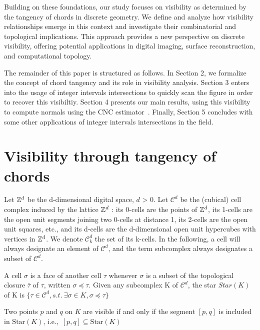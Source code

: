 \documentclass[runningheads]{llncs}
\begin{document}
    Building on these foundations, our study focuses on visibility as determined by the tangency of chords in discrete geometry.
    We define and analyze how visibility relationships emerge in this context and investigate their combinatorial and topological implications.
    This approach provides a new perspective on discrete visibility, offering potential applications in digital imaging, surface reconstruction, and computational topology.

    The remainder of this paper is structured as follows.
    In Section 2, we formalize the concept of chord tangency and its role in visibility analysis.
    Section 3 enters into the usage of integer intervals intersections to quickly scan the figure in order to recover this visibiltiy.
    Section 4 presents our main results, using this visibility to compute normals using the CNC estimator~\cite{lachaud:2022-dcg}.
    Finally, Section 5 concludes with some other applications of integer intervals intersections in the field.




    \section{Visibility through tangency of chords}


    Let $\mathbb{Z}^d$ be the d-dimensional digital space, $d$ > 0.
    Let $\mathcal{C}^d$ be the (cubical) cell complex induced by the lattice $\mathbb{Z}^d$ : its 0-cells are the points of $\mathbb{Z}^d$, its 1-cells are the open unit segments joining two 0-cells at distance 1, its 2-cells are the open unit squares, etc., and its d-cells are the d-dimensional open unit hypercubes with vertices in $\mathbb{Z}^d$.
    We denote $\mathcal{C}^d_k$ the set of its k-cells.
    In the following, a cell will always designate an element of $\mathcal{C}^d$, and the term subcomplex always designates a subset of $\mathcal{C}^d$.

    A cell $\sigma$ is a face of another cell $\tau$ whenever $\sigma$ is a subset of the topological closure $\bar{\tau}$ of $\tau$, written $\sigma \preccurlyeq \tau$.
    Given any subcomplex K of $\mathcal{C}^d$, the star $Star(K)$ of K is $\{\tau \in \mathcal{C}^d, s.t.\ \exists\sigma \in K,\sigma \preccurlyeq \tau\}$

    \begin{definition}
        Two points \( p \) and \( q \) on \( K \) are visible if and only if the segment \([p, q]\) is included in \(\text{Star}(K)\), i.e.,\ \( [p, q] \subseteq \text{Star}(K)\)
    \end{definition}
\end{document}
